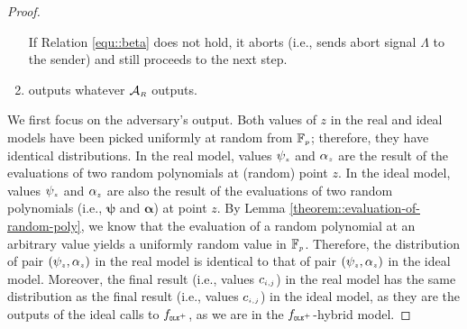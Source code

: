 \begin{proof}
\begin{enumerate}
%







%
 If Relation \ref{equ::beta} does not hold, it aborts (i.e., sends abort signal $\Lambda$ to the sender) and still proceeds to the next step. 
 
 \item outputs whatever $\mathcal{A}_{\scriptscriptstyle R}$ outputs. 
%
\end{enumerate}

We first focus on the adversary's output. Both values of $z$ in the real and ideal models have been picked uniformly at random from $\mathbb{F}_{\scriptscriptstyle p}$; therefore, they have identical distributions. In the real model, values  $\psi_{\scriptscriptstyle z}$ and $\alpha_{\scriptscriptstyle z}$ are the result of the evaluations of two random polynomials at (random) point $z$. In the ideal model, values $\psi_{\scriptscriptstyle  z}$ and $\alpha_{\scriptscriptstyle z}$ are also the result of the evaluations of two random polynomials (i.e., ${\bm\psi}$ and ${\bm\alpha}$) at point $ z$.  By Lemma \ref{theorem::evaluation-of-random-poly}, we know that the evaluation of a random polynomial at an arbitrary value  
 yields a uniformly random value in $\mathbb{F}_{\scriptscriptstyle p}$. Therefore, the distribution of pair $(\psi_{\scriptscriptstyle z}, \alpha_{\scriptscriptstyle z})$ in the real model is identical to that of pair $( \psi_{\scriptscriptstyle  z}, \alpha_{\scriptscriptstyle  z})$ in the ideal model. Moreover, the final result (i.e., values ${c}_{\scriptscriptstyle i,j}$) in the real model has the same distribution as the final result (i.e., values ${c}_{\scriptscriptstyle i,j}$)  in the ideal model, as they are the outputs of the ideal calls to $f_{\scriptscriptstyle \mathtt{OLE}^{\scriptscriptstyle +}}$, as we are in the $f_{\scriptscriptstyle \mathtt{OLE}^{\scriptscriptstyle +}}$-hybrid model. 


\end{proof}
